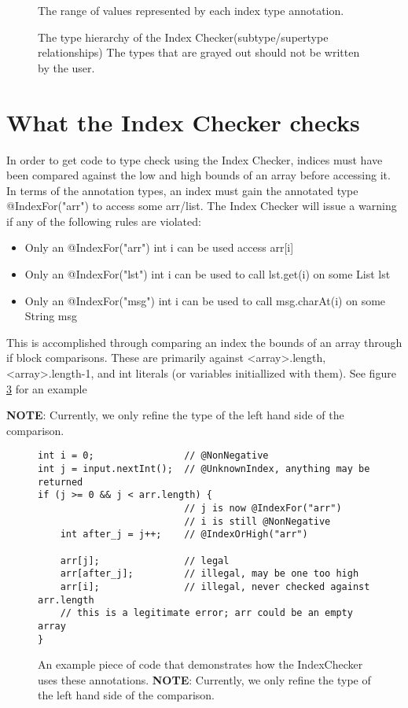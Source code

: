 \begin{figure}
\caption{The range of values represented by each index type annotation.}
\label{fig-index-figure}
\end{figure}

\begin{figure}
\caption{The type hierarchy of the Index Checker(subtype/supertype relationships)
The types that are grayed out should not be written by the user.}
\label{fig-index-heirarchy}
\end{figure}

\section{What the Index Checker checks\label{index-checks}}
In order to get code to type check using the Index Checker, indices must have been
compared against the low and high bounds of an array before accessing it. In terms
of the annotation types, an index must gain the annotated type @IndexFor("arr") to access some
arr/list. The Index Checker will issue a warning if any of the following rules are violated:
\begin{itemize}
\item Only an @IndexFor("arr") int i can be used access arr[i]
\item Only an @IndexFor("lst") int i can be used to call lst.get(i) on some List lst
\item Only an @IndexFor("msg") int i can be used to call msg.charAt(i) on some String msg
\end{itemize}

This is accomplished through comparing an index the bounds of an array through if block
comparisons. These are primarily against <array>.length, <array>.length-1, and int literals
(or variables initiallized with them). See figure \ref{fig-index-hierarchy} for an example

\textbf{NOTE}: Currently, we only refine the type of the left hand side of the comparison.

\begin{figure}
\begin{Verbatim}
int i = 0;                // @NonNegative
int j = input.nextInt();  // @UnknownIndex, anything may be returned
if (j >= 0 && j < arr.length) {
                          // j is now @IndexFor("arr")
                          // i is still @NonNegative
    int after_j = j++;    // @IndexOrHigh("arr")

    arr[j];               // legal
    arr[after_j];         // illegal, may be one too high
    arr[i];               // illegal, never checked against arr.length
    // this is a legitimate error; arr could be an empty array
}
\end{Verbatim}
\caption{An example piece of code that demonstrates how the IndexChecker uses these annotations. \textbf{NOTE}: Currently, we only refine the type of the left hand side of the comparison.}
\label{fig-index-hierarchy}
\end{figure}

